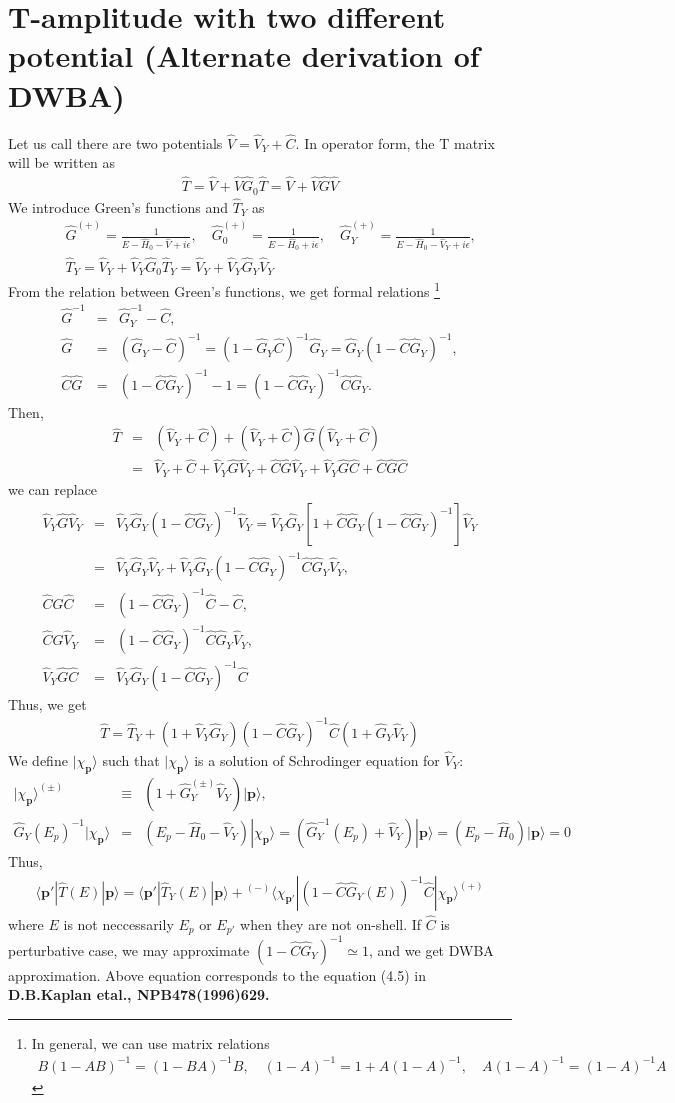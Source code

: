 \documentclass[10pt]{book}
\def\bm{\boldsymbol}
\newcommand{\bea}{\begin{eqnarray}}
\newcommand{\eea}{\end{eqnarray}}
\newcommand{\no}{\nonumber \\}
\def\vp{{\bm p}}
\def\la{\langle}
\def\ra{\rangle}
\begin{document}
\newpage
\section{T-amplitude with two different potential
(Alternate derivation of DWBA)
}
Let us call there are two potentials 
$\hat{V}=\hat{V}_Y+\hat{C}$.
In operator form, the T matrix will be written as
\bea
\hat{T}=\hat{V}+\hat{V}\hat{G}_0\hat{T}
       =\hat{V}+\hat{V}\hat{G}\hat{V} 
\eea
We introduce Green's functions and $\hat{T}_Y$ as
\bea
& &\hat{G}^{(+)}=\frac{1}{E-\hat{H}_0-\hat{V}+i\epsilon},\quad
\hat{G}^{(+)}_0=\frac{1}{E-\hat{H}_0+i\epsilon},\quad
\hat{G}^{(+)}_Y=\frac{1}{E-\hat{H}_0-\hat{V}_Y+i\epsilon},\no
& &\hat{T}_Y=\hat{V}_Y+\hat{V}_Y\hat{G}_0\hat{T}_Y
            =\hat{V}_Y+\hat{V}_Y\hat{G}_Y\hat{V}_Y  
\eea
From the relation between Green's functions, we get formal relations
\footnote{In general, we can use matrix relations 
\bea
B(1-AB)^{-1}=(1-BA)^{-1}B, \quad
(1-A)^{-1}=1+A(1-A)^{-1},\quad
A(1-A)^{-1}=(1-A)^{-1}A
\eea
}
\bea
\hat{G}^{-1}&=&\hat{G}_Y^{-1}-\hat{C},\no
\hat{G}&=&(\hat{G}_Y-\hat{C})^{-1}
        =(1-\hat{G}_Y\hat{C})^{-1}\hat{G}_Y
        =\hat{G}_Y(1-\hat{C}\hat{G}_Y)^{-1},\no
\hat{C}\hat{G}&=& (1-\hat{C}\hat{G}_Y)^{-1}-1
      =(1-\hat{C}\hat{G}_Y)^{-1}\hat{C}\hat{G}_Y.   
\eea
Then, 
\bea
\hat{T}&=&(\hat{V}_Y+\hat{C})
          +(\hat{V}_Y+\hat{C})\hat{G}(\hat{V}_Y+\hat{C})\no
       &=&\hat{V}_Y+\hat{C}
          +\hat{V}_Y\hat{G}\hat{V}_Y
          +\hat{C}\hat{G}\hat{V}_Y
          +\hat{V}_Y\hat{G}\hat{C}
          +\hat{C}\hat{G}\hat{C}
\eea
we can replace
\bea
\hat{V}_Y\hat{G}\hat{V}_Y
&=&\hat{V}_Y\hat{G}_Y(1-\hat{C}\hat{G}_Y)^{-1} \hat{V}_Y
 =\hat{V}_Y\hat{G}_Y[1+\hat{C}\hat{G}_Y(1-\hat{C}\hat{G}_Y)^{-1}]\hat{V}_Y
 \no
 &=&\hat{V}_Y\hat{G}_Y\hat{V}_Y
    +\hat{V}_Y\hat{G}_Y(1-\hat{C}\hat{G}_Y)^{-1}\hat{C}\hat{G}_Y\hat{V}_Y,\no
\hat{C}\hat{G}\hat{C}
     &=&   (1-\hat{C}\hat{G}_Y)^{-1}\hat{C}-\hat{C},\no 
\hat{C}\hat{G}\hat{V}_Y
 &=&(1-\hat{C}\hat{G}_Y)^{-1}\hat{C}\hat{G}_Y\hat{V}_Y,\no
\hat{V}_Y\hat{G}\hat{C}
     &=&\hat{V}_Y\hat{G}_Y(1-\hat{C}\hat{G}_Y)^{-1}\hat{C}
\eea
Thus, we get
\bea
\hat{T}=\hat{T}_Y+
(1+\hat{V}_Y\hat{G}_Y)(1-\hat{C}\hat{G}_Y)^{-1}\hat{C}
(1+\hat{G}_Y\hat{V}_Y)
\eea
We define $|\chi_\vp\ra$ such that $|\chi_\vp\ra$
is a solution of Schrodinger equation for $\hat{V}_Y$:
\bea
|\chi_\vp\ra^{(\pm)}&\equiv& (1+\hat{G}^{(\pm)}_Y\hat{V}_Y)|\vp\ra,\no
\hat{G}_Y(E_p)^{-1}|\chi_\vp\ra
&=&(E_p-\hat{H}_0-\hat{V}_Y)|\chi_\vp\ra
=(\hat{G}_Y^{-1}(E_p)+\hat{V}_Y)|\vp\ra=(E_p-\hat{H}_0)|\vp\ra=0
\eea
Thus,
\bea
\la \vp'|\hat{T}(E)|\vp\ra
=\la \vp'|\hat{T}_Y(E)|\vp\ra
 +{}^{(-)}\la \chi_{\vp'}|(1-\hat{C}\hat{G}_Y(E))^{-1}\hat{C}
  |\chi_{\vp}\ra^{(+)}
\eea
where $E$ is not neccessarily $E_p$ or $E_{p'}$ when they are not on-shell.
If $\hat{C}$ is perturbative case, we may approximate
$(1-\hat{C}\hat{G}_Y)^{-1}\simeq 1$, and we get 
DWBA approximation. Above equation corresponds to the equation (4.5) in {\bf D.B.Kaplan etal., NPB478(1996)629.}
\end{document}
